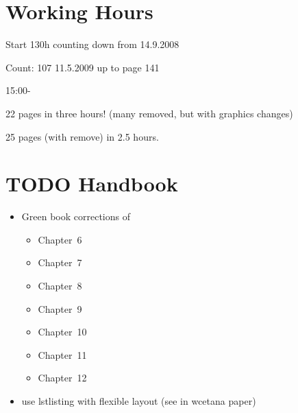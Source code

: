 \section{Working Hours}

Start 130h counting down from 14.9.2008

Count: 107 11.5.2009 up to page 141

15:00-


22 pages in three hours! (many removed, but with graphics changes)

25 pages (with remove) in 2.5 hours.

\section{TODO Handbook}

\begin{itemize}
  \item Green book corrections of
  \begin{itemize}
    \item Chapter~6
    \item Chapter~7
    \item Chapter~8
    \item Chapter~9
    \item Chapter~10
    \item Chapter~11
    \item Chapter~12
  \end{itemize}
  \item use lstlisting with flexible layout (see in wcetana
      paper)


\end{itemize}
